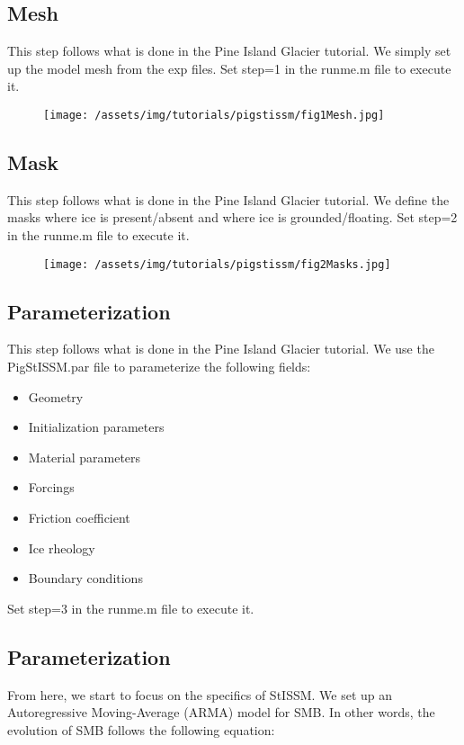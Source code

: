 \subsection{Mesh}%
This step follows what is done in the Pine Island Glacier tutorial. We simply set up the model mesh from the exp files. Set step=1 in the runme.m file to execute it.
\begin{figure}
	\begin{center}
		\texttt{[image: /assets/img/tutorials/pigstissm/fig1Mesh.jpg]}
	\end{center}
\end{figure}

\subsection{Mask}%
This step follows what is done in the Pine Island Glacier tutorial. We define the masks where ice is present/absent and where ice is grounded/floating. Set step=2 in the runme.m file to execute it.
\begin{figure}
	\begin{center}
		\texttt{[image: /assets/img/tutorials/pigstissm/fig2Masks.jpg]}
	\end{center}
\end{figure}

\subsection{Parameterization}%
This step follows what is done in the Pine Island Glacier tutorial. We use the PigStISSM.par file to parameterize the following fields:
\begin{itemize}
	\item Geometry
	\item Initialization parameters
	\item Material parameters
	\item Forcings
	\item Friction coefficient
	\item Ice rheology
	\item Boundary conditions
\end{itemize}
Set step=3 in the runme.m file to execute it.

\subsection{Parameterization}%
From here, we start to focus on the specifics of StISSM. We set up an Autoregressive Moving-Average (ARMA) model for SMB. In other words, the evolution of SMB follows the following equation:

